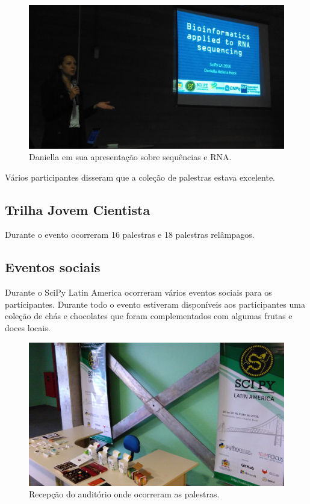 \documentclass[12pt]{article}
\begin{document}
\begin{figure}[!htb]
\center
\includegraphics[height=.3\textheight]{talks-rna.jpg}
\caption{Daniella em sua apresentação sobre sequências e RNA.}
\end{figure}

Vários participantes disseram que a coleção de palestras estava excelente.

\subsection*{Trilha Jovem Cientista}


Durante o evento ocorreram 16 palestras e 18 palestras relâmpagos.

\subsection*{Eventos sociais}

Durante o SciPy Latin America ocorreram vários eventos sociais para os
participantes. Durante todo o evento estiveram disponíveis aos participantes uma
coleção de chás e chocolates que foram complementados com algumas frutas e doces
locais.

\begin{figure}[!htb]
\center
\includegraphics[height=.3\textheight]{social-break.jpg}
\caption{Recepção do auditório onde ocorreram as palestras.}
\end{figure}
\end{document}
